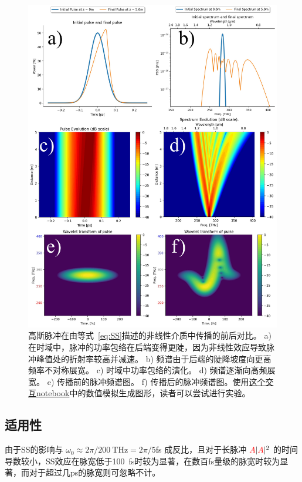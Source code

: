 \begin{figure}
    \centering
    \includegraphics[width=1.0\linewidth]{figures/SPM_and_SS_combined.png}
    \caption{高斯脉冲在由等式~\ref{eq:SS}描述的非线性介质中传播的前后对比。 
    a) 在时域中，脉冲的功率包络在后端变得更陡，因为非线性效应导致脉冲峰值处的折射率较高并减速。 b) 频谱由于后端的陡降坡度向更高频率不对称展宽。 c) 时域中功率包络的演化。 d) 频谱逐渐向高频展宽。 e) 传播前的脉冲频谱图。 f) 传播后的脉冲频谱图。使用\href{https://colab.research.google.com/drive/1P41F4hO6Mv12RsEkpogYv5teQyFZ6iW0?usp=sharing}{这个交互notebook}中的数值模拟生成图形，读者可以尝试进行实验。}
    \label{fig:SS}
\end{figure}

\subsection{适用性}
由于SS的影响与 $\omega_0\approx 2\pi/200~\text{THz} = 2\pi/5$fs 成反比，且对于长脉冲 $\textcolor{red}{A}|\textcolor{red}{A}|^2$ 的时间导数较小，SS效应在脉宽低于100~fs时较为显著，在数百fs量级的脉宽时较为显著，而对于超过几ps的脉宽则可忽略不计。



